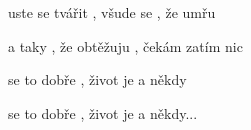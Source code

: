 \ks

\zs
{}uste se tvářit ,
všude se , že umřu 

a taky , že obtěžuju ,
čekám  zatím nic 
\ks

\zs
{} se to dobře ,
život je  a někdy 

 se to dobře ,
život je  a někdy...
\ks
\kp















